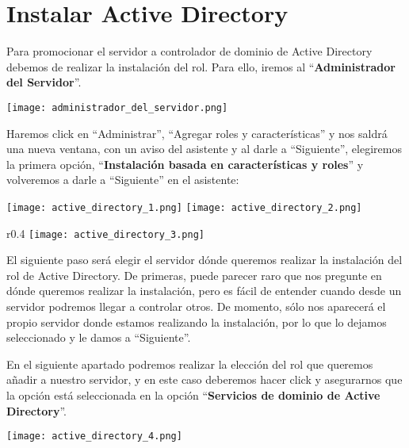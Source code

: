 \section{Instalar Active Directory}
Para promocionar el servidor a controlador de dominio de Active Directory debemos de realizar la instalación del rol. Para ello, iremos al “\textbf{Administrador del Servidor}”.

\begin{center}
    \texttt{[image: administrador\_del\_servidor.png]}
\end{center}

Haremos click en “Administrar”, “Agregar roles y características” y nos saldrá una nueva ventana, con un aviso del asistente y al darle a “Siguiente”, elegiremos la primera opción, “\textbf{Instalación basada en características y roles}” y volveremos a darle a “Siguiente” en el asistente:

\begin{center}
    \texttt{[image: active\_directory\_1.png]}
    \hfill
    \texttt{[image: active\_directory\_2.png]}
\end{center}


\begin{wrapfigure}{r}{0.4\linewidth}
    \centering
    \vspace{-10pt}
    \texttt{[image: active\_directory\_3.png]}
    \vspace{-40pt}
\end{wrapfigure}

El siguiente paso será elegir el servidor dónde queremos realizar la instalación del rol de Active Directory. De primeras, puede parecer raro que nos pregunte en dónde queremos realizar la instalación, pero es fácil de entender cuando desde un servidor podremos llegar a controlar otros. De momento, sólo nos aparecerá el propio servidor donde estamos realizando la instalación, por lo que lo dejamos seleccionado y le damos a “Siguiente”.

En el siguiente apartado podremos realizar la elección del rol que queremos añadir a nuestro servidor, y en este caso deberemos hacer click y asegurarnos que la opción está seleccionada en la opción “\textbf{Servicios de dominio de Active Directory}”.


\begin{center}
    \vspace{-15pt}
    \texttt{[image: active\_directory\_4.png]}
    \vspace{-15pt}
\end{center}

